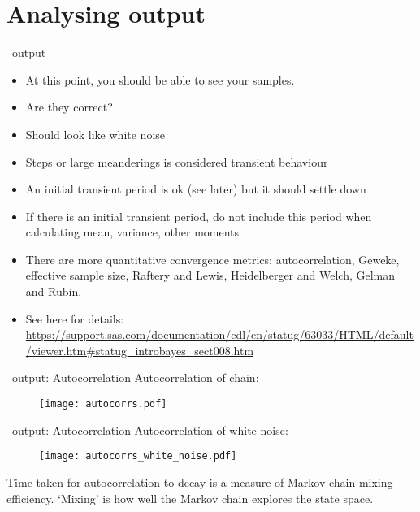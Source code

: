 \section{Analysing output}
\begin{frame}[fragile]{\Queso\ output}
  \begin{itemize}
    \item At this point, you should be able to see your samples.
    \item Are they correct?
    \item Should look like white noise
    \item Steps or large meanderings is considered transient behaviour
    \item An initial transient period is ok (see later) but it should settle
      down
    \item If there is an initial transient period, do not include this period
      when calculating mean, variance, other moments
    \item There are more quantitative convergence metrics: autocorrelation,
      Geweke, effective sample size, Raftery and Lewis, Heidelberger and Welch,
      Gelman and Rubin.
    \item See here for details: \url{https://support.sas.com/documentation/cdl/en/statug/63033/HTML/default/viewer.htm#statug_introbayes_sect008.htm}
  \end{itemize}
\end{frame}

\begin{frame}[fragile]{\Queso\ output: Autocorrelation}
  Autocorrelation of chain:
  \begin{figure}
    \begin{center}
      \texttt{[image: autocorrs.pdf]}
    \end{center}
  \end{figure}
\end{frame}

\begin{frame}[fragile]{\Queso\ output: Autocorrelation}
  Autocorrelation of white noise:
  \begin{figure}
    \begin{center}
      \texttt{[image: autocorrs\_white\_noise.pdf]}
    \end{center}
  \end{figure}
  Time taken for autocorrelation to decay is a measure of Markov chain mixing
  efficiency.  `Mixing' is how well the Markov chain explores the state space.
\end{frame}

